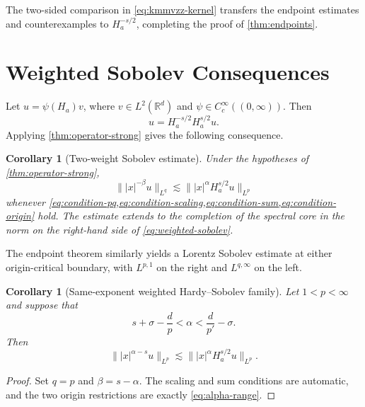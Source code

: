 \documentclass[11pt]{amsart}
\numberwithin{equation}{section}
\theoremstyle{plain}
\newtheorem{corollary}[theorem]{Corollary}
\theoremstyle{definition}
\theoremstyle{remark}
\newcommand{\RR}{\mathbb{R}}
\newcommand{\Ha}{H_a}
\begin{document}
The two-sided comparison in \cref{eq:kmmvzz-kernel} transfers the endpoint estimates and counterexamples to $\Ha^{-s/2}$, completing the proof of \cref{thm:endpoints}.

\section{Weighted Sobolev Consequences}
\label{sec:sobolev}

Let $u=\psi(\Ha)v$, where $v\in L^2(\RR^d)$ and $\psi\in C_c^\infty((0,\infty))$. Then
\begin{equation}
 u=\Ha^{-s/2}\Ha^{s/2}u.
 \label{eq:spectral-identity}
\end{equation}
Applying \cref{thm:operator-strong} gives the following consequence.

\begin{corollary}[Two-weight Sobolev estimate]
\label{cor:two-weight-sobolev}
Under the hypotheses of \cref{thm:operator-strong},
\begin{equation}
 \bigl\||x|^{-\beta}u\bigr\|_{L^q}
 \lesssim
 \bigl\||x|^\alpha\Ha^{s/2}u\bigr\|_{L^p}
 \label{eq:weighted-sobolev}
\end{equation}
whenever \cref{eq:condition-pq,eq:condition-scaling,eq:condition-sum,eq:condition-origin} hold. The estimate extends to the completion of the spectral core in the norm on the right-hand side of \cref{eq:weighted-sobolev}.
\end{corollary}

The endpoint theorem similarly yields a Lorentz Sobolev estimate at either origin-critical boundary, with $L^{p,1}$ on the right and $L^{q,\infty}$ on the left.

\begin{corollary}[Same-exponent weighted Hardy--Sobolev family]
\label{cor:hardy-sobolev}
Let $1<p<\infty$ and suppose that
\begin{equation}
 s+\sigma-\frac d p
 <\alpha
 <\frac d{p'}-\sigma.
 \label{eq:alpha-range}
\end{equation}
Then
\begin{equation}
 \bigl\||x|^{\alpha-s}u\bigr\|_{L^p}
 \lesssim
 \bigl\||x|^\alpha\Ha^{s/2}u\bigr\|_{L^p}.
 \label{eq:hardy-sobolev-family}
\end{equation}
\end{corollary}

\begin{proof}
Set $q=p$ and $\beta=s-\alpha$. The scaling and sum conditions are automatic, and the two origin restrictions are exactly \cref{eq:alpha-range}.
\end{proof}
\end{document}
